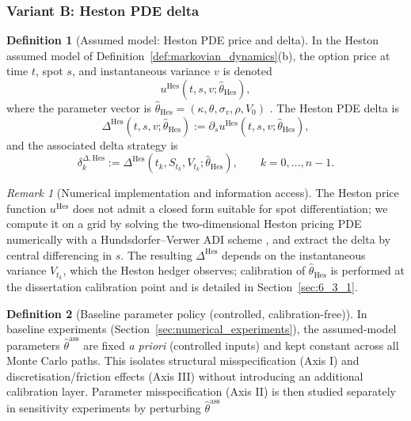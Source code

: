 \documentclass[12pt,a4paper]{article}
\theoremstyle{definition}
\newtheorem{definition}{Definition}[section]
\theoremstyle{plain}
\theoremstyle{remark}
\newtheorem{remark}{Remark}[section]
\theoremstyle{plain}
\begin{document}
\subsubsection{Variant B: Heston PDE delta}
\label{subsubsec:heston_delta}

\begin{definition}[Assumed model: Heston PDE price and delta]
\label{def:heston_pde_delta}
In the Heston assumed model of Definition~\ref{def:markovian_dynamics}(b),
the option price at time $t$, spot $s$, and instantaneous variance $v$ is
denoted
\[
u^{\mathrm{Hes}}(t, s, v;\hat\theta_{\mathrm{Hes}}),
\]
where the parameter vector is
$\hat\theta_{\mathrm{Hes}} = (\kappa, \theta, \sigma_v, \rho, V_0)$
\cite{Heston1993}. The Heston PDE delta is
\[
\Delta^{\mathrm{Hes}}(t, s, v;\hat\theta_{\mathrm{Hes}})
:= \partial_s u^{\mathrm{Hes}}(t, s, v;\hat\theta_{\mathrm{Hes}}),
\]
and the associated delta strategy is
\[
\delta_k^{\Delta, \mathrm{Hes}}
:= \Delta^{\mathrm{Hes}}\!\left(t_k, S_{t_k}, V_{t_k};
\hat\theta_{\mathrm{Hes}}\right),
\qquad k = 0, \ldots, n-1.
\]
\end{definition}

\begin{remark}[Numerical implementation and information access]
\label{rem:heston_pde_delta_implementation}
The Heston price function $u^{\mathrm{Hes}}$ does not admit a closed form
suitable for spot differentiation; we compute it on a grid by solving the
two-dimensional Heston pricing PDE numerically with a Hundsdorfer--Verwer
ADI scheme \cite{HundsdorferVerwer2003}, and extract the delta by central
differencing in $s$. The resulting $\Delta^{\mathrm{Hes}}$ depends on the
instantaneous variance $V_{t_k}$, which the Heston hedger observes;
calibration of $\hat\theta_{\mathrm{Hes}}$ is performed at the dissertation
calibration point and is detailed in Section~\ref{sec:6_3_1}.
\end{remark}

\label{subsubsec:delta_calibration_policy}

\begin{definition}[Baseline parameter policy (controlled, calibration-free)]
\label{def:baseline_param_policy}
In baseline experiments (Section~\ref{sec:numerical_experiments}), the assumed-model parameters
$\hat\theta^{\mathrm{ass}}$ are fixed \emph{a priori} (controlled inputs) and kept constant across all Monte Carlo paths.
This isolates structural misspecification (Axis I) and discretisation/friction effects (Axis III) without introducing an additional calibration layer.
Parameter misspecification (Axis II) is then studied separately in sensitivity experiments by perturbing $\hat\theta^{\mathrm{ass}}$ \cite{ElKaroui1998Robustness}
\end{definition}
\end{document}
